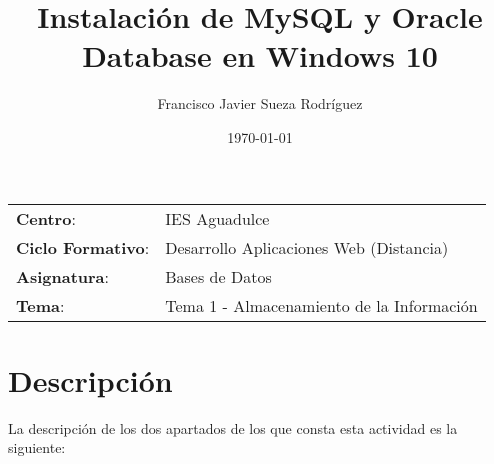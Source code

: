 


\title{
\normalfont \normalsize
\huge \textbf{Instalación de MySQL y Oracle Database en Windows 10}
}
\author{Francisco Javier Sueza Rodríguez}
\date{\normalsize\today}



\maketitle

\vspace{2ex}

\begin{center}
    \begin{tabular}{l l}
        \textbf{Centro}: & IES Aguadulce \\
        \textbf{Ciclo Formativo}: & Desarrollo Aplicaciones Web (Distancia)\\
        \textbf{Asignatura}: & Bases de Datos\\
        \textbf{Tema}: & Tema 1 - Almacenamiento de la Información \\
    \end{tabular}
\end{center}

\vspace{10ex}

\section{Descripción}
La descripción de los dos apartados de los que consta esta actividad es la siguiente:

